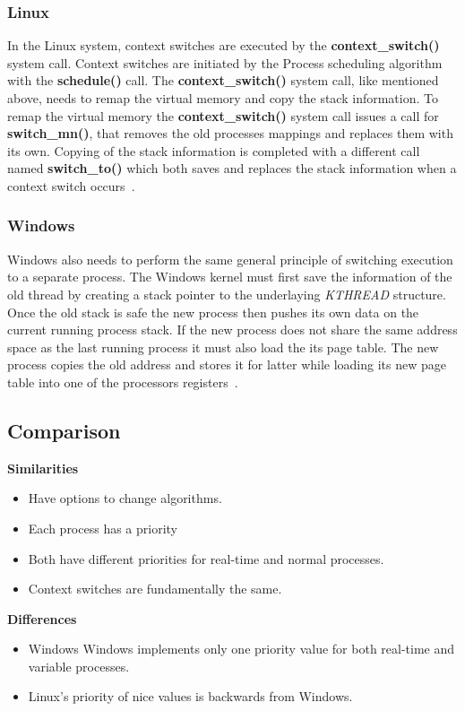\documentclass[letterpaper,10pt,notitlepage,fleqn]{article}
\begin{document}
\subsubsection*{Linux} 
In the Linux system, context switches are executed by the \textbf{context\_switch()} 
system call. Context switches are initiated by the Process scheduling algorithm 
with the \textbf{schedule()} call. The \textbf{context\_switch()} system call, 
like mentioned above, needs to remap the virtual memory and copy the stack information. 
To remap the virtual memory the \textbf{context\_switch()} system call issues a 
call for \textbf{switch\_mn()}, that removes the old processes mappings and replaces 
them with its own. Copying of the stack information is completed with a different 
call named \textbf{switch\_to()} which both saves and replaces the stack information 
when a context switch occurs~\cite{LKD3}. 

\subsubsection*{Windows}
Windows also needs to perform the same general principle of switching execution 
to a separate process. The Windows kernel must first save the information of the 
old thread by creating a stack pointer to the underlaying \textit{KTHREAD} structure. 
Once the old stack is safe the new process then pushes its own data on the current 
running process stack. If the new process does not share the same address space as 
the last running process it must also load the its page table. The new  process
copies the old address and stores it for latter while loading its new page table 
into one of the processors registers~\cite{WI16}.

\subsection*{Comparison}
\noindent \textbf{Similarities}\\
\begin{itemize}
    \item Have options to change algorithms.
    \item Each process has a priority
    \item Both have different priorities for real-time and normal processes.
    \item Context switches are fundamentally the same.
\end{itemize}
\noindent \textbf{Differences}\\
\begin{itemize}
    \item Windows Windows implements only one priority value for both real-time and 
    variable processes.
    \item Linux's priority of nice values is backwards from Windows.

\end{itemize}
\end{document}
